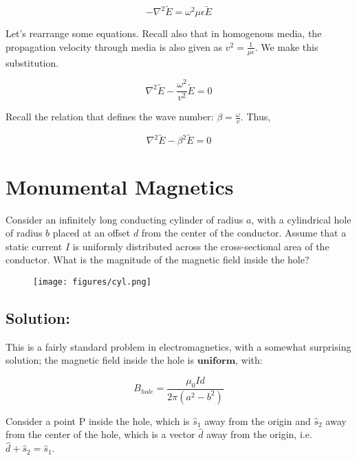 \documentclass{article}
\begin{document}
$$- \nabla^2 \tilde{E} = \omega^2 \mu \epsilon \tilde{E}$$

Let's rearrange some equations. Recall also that in homogenous media, the propagation velocity through media is also given as $v^2 = \frac{1}{\mu \epsilon}$. We make this substitution.

$$\nabla^2 \tilde{E} - \frac{\omega^2}{v^2} \tilde{E} = 0$$

Recall the relation that defines the wave number: $\beta = \frac{\omega}{v}$. Thus,

$$\boxed{\nabla^2 \tilde{E} - \beta^2 \tilde{E} = 0}$$

\newpage

\section{Monumental Magnetics}

Consider an infinitely long conducting cylinder of radius $a$, with a cylindrical hole of radius $b$ placed at an offset $d$ from the center of the conductor. Assume that a static current $I$ is uniformly distributed across the cross-sectional area of the conductor. What is the magnitude of the magnetic field inside the hole?

\begin{figure}[H]
\begin{center}
    \texttt{[image: figures/cyl.png]}
\end{center}
\end{figure}

\subsection{Solution:} This is a fairly standard problem in electromagnetics, with a somewhat surprising solution; the magnetic field inside the hole is $\textbf{uniform}$, with:

\[
B_{hole} = \frac{\mu_0 I d}{2\pi (a^2-b^2)}
\]

Consider a point P inside the hole, which is $\hat{s}_1$ away from the origin and $\hat{s}_2$ away from the center of the hole, which is a vector $\hat{d}$ away from the origin, i.e. $\hat{d} + \hat{s}_2 = \hat{s}_1$. 

\begin{figure}[ht!]
\centering
{}
\end{figure}
\end{document}
